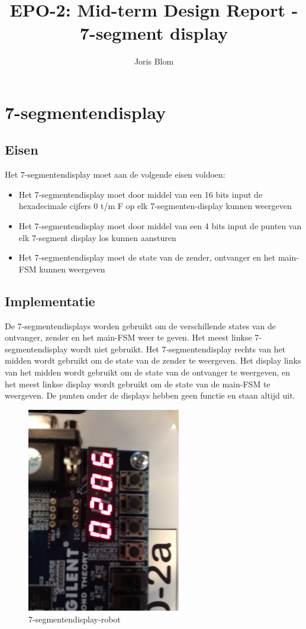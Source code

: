 \documentclass{report}
\title{EPO-2: Mid-term Design Report - 7-segment display}
\author{Joris Blom}
\begin{document}
\chapter{7-segmentendisplay}
\label{ch:sseg}
\section{Eisen}
\label{sec:Eisen}
Het 7-segmentendisplay moet aan de volgende eisen voldoen: 
\begin{itemize}
\item Het 7-segmentendisplay moet door middel van een 16 bits input de hexadecimale cijfers 0 t/m F op elk 7-segmenten-display kunnen weergeven
\item Het 7-segmentendisplay moet door middel van een 4 bits input de punten van elk 7-segment display los kunnen aansturen
\item Het 7-segmentendisplay moet de state van de zender, ontvanger en het main-FSM kunnen weergeven
\end{itemize}

\section{Implementatie}
De 7-segmentendisplays worden gebruikt om de verschillende states van de ontvanger, zender en het main-FSM weer te geven.
Het meest linkse 7-segmentendisplay wordt niet gebruikt.
Het 7-segmentendisplay rechts van het midden wordt gebruikt om de state van de zender te weergeven.
Het display links van het midden wordt gebruikt om de state van de ontvanger te weergeven, en het meest linkse display wordt gebruikt om de state van de main-FSM te weergeven.
De punten onder de displays hebben geen functie en staan altijd uit.

\begin{figure}[H]
\centering
\includegraphics[width=0.6\textwidth]{7_segment_display-robot.jpg}

\caption{7-segmentendisplay-robot}
\end{figure}
\end{document}
